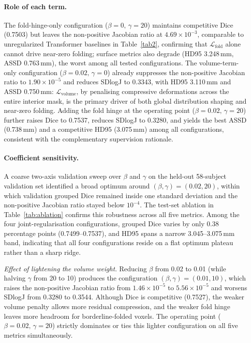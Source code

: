 \documentclass[jimaging,article,submit,pdftex,moreauthors]{Definitions/mdpi}
\begin{document}
\paragraph{Role of each term.} The fold-hinge-only configuration (\(\beta=0,\,\gamma=20\)) maintains competitive Dice (0.7503) but leaves the non-positive Jacobian ratio at \(4.69\times10^{-3}\), comparable to unregularized Transformer baselines in Table~\ref{tab2}, confirming that \(\mathcal{L}_{\mathrm{fold}}\) alone cannot drive near-zero folding; surface metrics also degrade (HD95 3.248\,mm, ASSD 0.763\,mm), the worst among all tested configurations. The volume-term-only configuration (\(\beta=0.02,\,\gamma=0\)) already suppresses the non-positive Jacobian ratio to \(1.90\times10^{-5}\) and reduces SDlogJ to 0.3343, with HD95 3.110\,mm and ASSD 0.750\,mm: \(\mathcal{L}_{\mathrm{volume}}\), by penalising compressive deformations across the entire interior mask, is the primary driver of both global distribution shaping and near-zero folding. Adding the fold hinge at the operating point (\(\beta=0.02,\,\gamma=20\)) further raises Dice to 0.7537, reduces SDlogJ to 0.3280, and yields the best ASSD (0.738\,mm) and a competitive HD95 (3.075\,mm) among all configurations, consistent with the complementary supervision rationale.

\paragraph{Coefficient sensitivity.}
A coarse two-axis validation sweep over \(\beta\) and \(\gamma\) on the held-out 58-subject validation set identified a broad optimum around \((\beta,\gamma)=(0.02,20)\), within which validation grouped Dice remained inside one standard deviation and the non-positive Jacobian ratio stayed below \(10^{-4}\).
The test-set ablation in Table~\ref{tab:ablation} confirms this robustness across all five metrics.
Among the four joint-regularisation configurations, grouped Dice varies by only 0.38 percentage points (0.7499--0.7537), and HD95 spans a narrow 3.045--3.075\,mm band, indicating that all four configurations reside on a flat optimum plateau rather than a sharp ridge.

\textit{Effect of lightening the volume weight.}
Reducing \(\beta\) from 0.02 to 0.01 (while halving \(\gamma\) from 20 to 10) produces the configuration \((\beta,\gamma)=(0.01,10)\), which raises the non-positive Jacobian ratio from \(1.46\times10^{-5}\) to \(5.56\times10^{-5}\) and worsens SDlogJ from 0.3280 to 0.3544.
Although Dice is competitive (0.7527), the weaker volume penalty allows more residual compression, and the weaker fold hinge leaves more headroom for borderline-folded voxels.
The operating point (\(\beta=0.02,\,\gamma=20\)) strictly dominates or ties this lighter configuration on all five metrics simultaneously.
\end{document}
